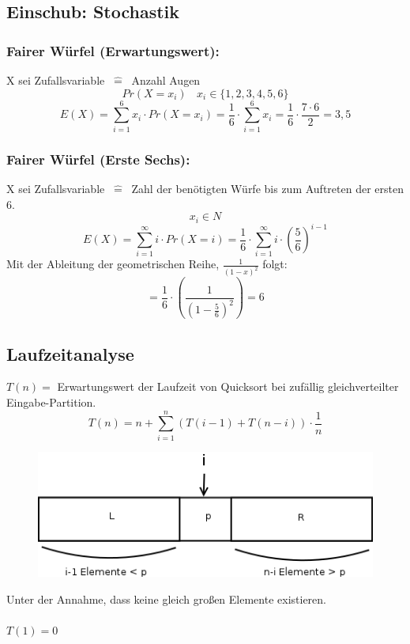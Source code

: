 \begin{mdframed}
\subsection{Einschub: Stochastik}
\subsubsection{Fairer Würfel (Erwartungswert):} X sei Zufallsvariable $~\hat{=}~$ Anzahl Augen\\
\[Pr(X=x_i)~~~~x_i \in \{1,2,3,4,5,6\} \]
\[E(X) = \sum_{i=1}^6 x_i \cdot Pr(X=x_i) = \frac{1}{6} \cdot \sum_{i=1}^6 x_i = \frac{1}{6} \cdot \frac{7 \cdot 6}{2} = 3,5 \]

\subsubsection{Fairer Würfel (Erste Sechs):} X sei Zufallsvariable  $~\hat{=}~$ Zahl der benötigten Würfe bis zum Auftreten der ersten 6.
\[x_i \in N\]
\[E(X) = \sum_{i=1}^{\infty} i \cdot Pr(X=i) = \frac{1}{6} \cdot \sum_{i=1}^{\infty} i \cdot \left(\frac{5}{6} \right)^{i-1} \]
Mit der Ableitung der geometrischen Reihe, $\frac{1}{(1-x)^2}$ folgt:\\
\[= \frac{1}{6} \cdot \left(\frac{1}{ \left(1-\frac{5}{6} \right)^2} \right) = 6 \]
\end{mdframed}


\subsection{Laufzeitanalyse}
$T(n) =$ Erwartungswert der Laufzeit von Quicksort bei zufällig gleichverteilter Eingabe-Partition.
\[T(n) = n + \sum_{i=1}^n (T(i-1) + T(n-i)) \cdot \frac{1}{n} \]
\vspace{20pt}
\begin{figure}
\vspace{-60pt}
\includegraphics[width=\linewidth]{06/Grafik/img3.png}
\caption{}
\vspace{300pt}
\end{figure}
Unter der Annahme, dass keine gleich großen Elemente existieren.\\
\\
$T(1) = 0 $
\pagebreak

